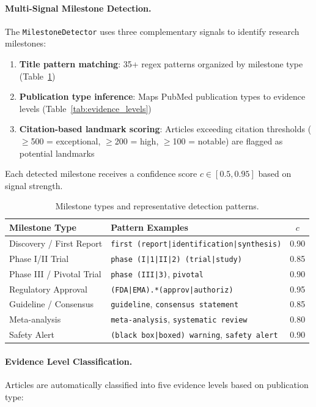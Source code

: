 \documentclass[11pt,a4paper]{article}
\begin{document}
\paragraph{Multi-Signal Milestone Detection.}
The \texttt{MilestoneDetector} uses three complementary signals to identify research milestones:

\begin{enumerate}
    \item \textbf{Title pattern matching}: 35+ regex patterns organized by milestone type (Table~\ref{tab:milestones})
    \item \textbf{Publication type inference}: Maps PubMed publication types to evidence levels (Table~\ref{tab:evidence_levels})
    \item \textbf{Citation-based landmark scoring}: Articles exceeding citation thresholds ($\geq$500 = exceptional, $\geq$200 = high, $\geq$100 = notable) are flagged as potential landmarks
\end{enumerate}

Each detected milestone receives a confidence score $c \in [0.5, 0.95]$ based on signal strength.

\begin{table}[htbp]
\centering
\caption{Milestone types and representative detection patterns.}
\label{tab:milestones}
\begin{tabular}{llc}
\toprule
\textbf{Milestone Type} & \textbf{Pattern Examples} & \textbf{$c$} \\
\midrule
Discovery / First Report & \texttt{first (report|identification|synthesis)} & 0.90 \\
Phase I/II Trial & \texttt{phase (I|1|II|2) (trial|study)} & 0.85 \\
Phase III / Pivotal Trial & \texttt{phase (III|3)}, \texttt{pivotal} & 0.90 \\
Regulatory Approval & \texttt{(FDA|EMA).*(approv|authoriz)} & 0.95 \\
Guideline / Consensus & \texttt{guideline}, \texttt{consensus statement} & 0.85 \\
Meta-analysis & \texttt{meta-analysis}, \texttt{systematic review} & 0.80 \\
Safety Alert & \texttt{(black box|boxed) warning}, \texttt{safety alert} & 0.90 \\
\bottomrule
\end{tabular}
\end{table}

\paragraph{Evidence Level Classification.}
Articles are automatically classified into five evidence levels based on publication type:
\end{document}
